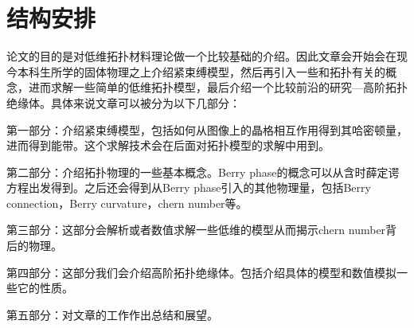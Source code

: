  \section{结构安排}
 论文的目的是对低维拓扑材料理论做一个比较基础的介绍。因此文章会开始会在现今本科生所学的固体物理之上介绍紧束缚模型，然后再引入一些和拓扑有关的概念，进而求解一些简单的低维拓扑模型，最后介绍一个比较前沿的研究—高阶拓扑绝缘体。具体来说文章可以被分为以下几部分：
 
第一部分：介绍紧束缚模型，包括如何从图像上的晶格相互作用得到其哈密顿量，进而得到能带。这个求解技术会在后面对拓扑模型的求解中用到。

第二部分：介绍拓扑物理的一些基本概念。Berry phase的概念可以从含时薛定谔方程出发得到。之后还会得到从Berry phase引入的其他物理量，包括Berry connection，Berry curvature，chern number等。

第三部分：这部分会解析或者数值求解一些低维的模型从而揭示chern number背后的物理。

第四部分：这部分我们会介绍高阶拓扑绝缘体。包括介绍具体的模型和数值模拟一些它的性质。

第五部分：对文章的工作作出总结和展望。